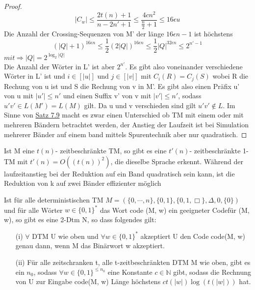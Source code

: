\begin{proof}
        \[
            |C_w| \leq \frac{2t(n)+1}{n-2n' + 1} \leq \frac{4cn^2}{\frac{n}{2} + 1} \leq 16\epsilon u    
        \]
        Die Anzahl der Crossing-Sequenzen von M' der länge \(16\epsilon n -1\) ist höchstens 
        \[
            (|Q| + 1)^{16\epsilon n} \leq \frac{1}{2} (2|Q|)^{16 \epsilon n} \leq \frac{1}{2} |Q|^{32 \epsilon n} \leq 2^{n'-1} 
        \]
        \(mit \Rightarrow |Q| = 2^{\log_2 |Q|}\) \\ Die Anzahl der Wörter in L' ist aber \(2^{n'}\). Es gibt also voneinander verschiedene Wörter in L' ist und \(i \in [|u|]\) und \(j \in [|v|]\) mit \(C_i(R) = C_j(S)\) wobei R die Rechung von u ist und S die Rechung von v in M'. Es gibt also einen Präfix u' von u mit \(|u'| \leq n'\) und einen Suffix v' von v mit \(|v'| \leq n'\), sodass \(u' v' \in L(M') = L(M)\) gilt. Da u und v verschieden sind gilt \(u' v' \not \in L\). 
        \medskip
        Im Sinne von \hyperref[subsec:7.9]{Satz 7.9} macht es zwar einen Unterschied ob TM mit einem oder mit mehreren Bändern betrachtet werden, der Anstieg der Laufzeit ist bei Simulation mehrerer Bänder auf einem band mittels Spurentechnik aber nur quadratisch.
    \end{proof}

    Ist M eine \(t(n)\)- zeitbeschränkte TM, so gibt es eine \(t'(n)\)- zeitbeschränkte 1-TM mit \(t'(n) = O((t(n))^2)\), die dieselbe Sprache erkennt. Während der laufzeitanstieg bei der Reduktion auf ein Band quadratisch sein kann, ist die Reduktion von k auf zwei Bänder effizienter möglich 

    Ist für alle deterministischen TM \(M = (\{0, \cdots, n\}, \{0, 1\}, \{0, 1, \Box\}, \Delta, 0, \{0\})\) und für alle Wörter \(w \in \{0, 1\}^*\) das Wort code (M, w) ein geeigneter Codefür (M, w), so gibt es eine 2-Dtm N, so dass folgendes gilt:

    \begin{itemize}
        \item [(i)] \(\forall\) DTM U wie oben und \(\forall w \in \{0, 1\}^*\) akzeptiert U den Code code(M, w) genau dann, wenn M das Binärwort w akzeptiert.
        \item [(ii)] Für alle zeitschranken t, alle t-zeitbeschränkten DTM M wie oben, gibt es ein \(n_0\), sodass \(\forall w \in \{0, 1\}^{\leq n_0}\) eine Konstante \(c \in \mathbb{N}\) gibt, sodass die Rechnung von U zur Eingabe code(M, w) Länge höchstens \(ct(|w|)\log(t(|w|))\) hat.
    \end{itemize}

